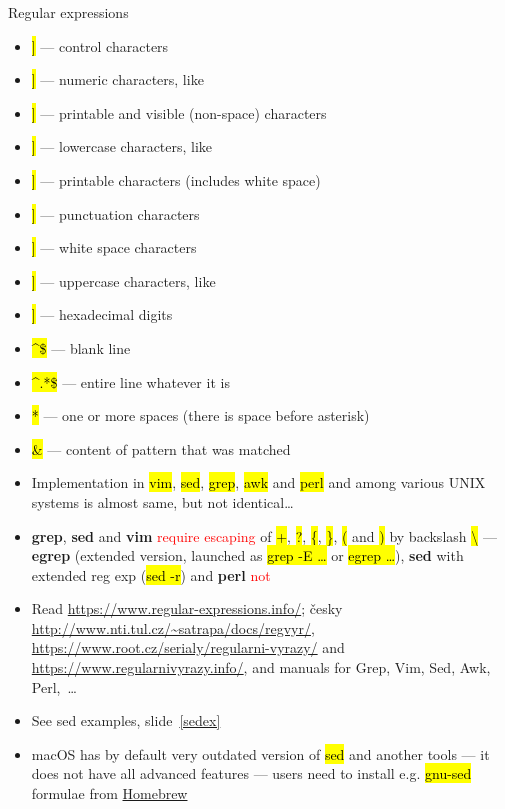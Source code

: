 \documentclass[compress, ucs, xelatex, 11pt, xcolor=svgnames,
  hyperref={
    bookmarks=true,
    unicode=true,
    colorlinks=true,
    pdftitle={Linux, command line and MetaCentrum},
    plainpages=false,
    pdfauthor={Vojtech Zeisek},
    pdfsubject={Course about use of Linux command line, writing shell scripts and using MetaCentrum of CESNET},
    pdfcreator={XeLaTeX},
    pdfkeywords={Linux, GNU, BASH, shell, command line, MetaCentrum},
    linkcolor=DarkRed,
    anchorcolor=DarkBlue,
    citecolor=Indigo,
    filecolor=NavyBlue,
    menucolor=DarkMagenta,
    urlcolor=DarkBlue,
    pdftex},
  url={hyphens, lowtilde} %
  ]{beamer}
\renewcommand{\texttt}[1]{\hl{\ttfamily #1}}
\renewcommand{\alert}[1]{\textcolor{red}{#1}}
\begin{document}
\begin{frame}[allowframebreaks]{Regular expressions}
\begin{itemize}
    \item \alert{\texttt{[[:cntrl:]]}} --- control characters
    \item \alert{\texttt{[[:digit:]]}} --- numeric characters, like \alert{\texttt{[0-9]}}
    \item \alert{\texttt{[[:graph:]]}} --- printable and visible (non-space) characters
    \item \alert{\texttt{[[:lower:]]}} --- lowercase characters, like \alert{\texttt{[a-z]}}
    \item \alert{\texttt{[[:print:]]}} --- printable characters (includes white space)
    \item \alert{\texttt{[[:punct:]]}} --- punctuation characters
    \item \alert{\texttt{[[:space:]]}} --- white space characters
    \item \alert{\texttt{[[:upper:]]}} --- uppercase characters, like \alert{\texttt{[A-Z]}}
    \item \alert{\texttt{[[:xdigit:]]}} --- hexadecimal digits
    \item \alert{\texttt{\textasciicircum\$}} --- blank line
    \item \alert{\texttt{\textasciicircum.*\$}} --- entire line whatever it is
    \item \alert{\texttt{ *}} --- one or more spaces (there is space before asterisk)
    \item \alert{\texttt{\&}} --- content of pattern that was matched
    \item Implementation in \texttt{vim}, \texttt{sed}, \texttt{grep}, \texttt{awk} and \texttt{perl} and among various UNIX systems is almost same, but not identical\ldots
    \item \textbf{grep}, \textbf{sed} and \textbf{vim} \alert{require escaping} of \alert{\texttt{+}}, \alert{\texttt{?}}, \alert{\texttt{\{}}, \alert{\texttt{\}}}, \alert{\texttt{(}} and \alert{\texttt{)}} by backslash \alert{\texttt{\textbackslash}} --- \textbf{egrep} (extended version, launched as \texttt{grep -E \ldots} or \texttt{egrep \ldots}), \textbf{sed} with extended reg exp (\texttt{sed -r}) and \textbf{perl} \alert{not}
    \item Read \url{https://www.regular-expressions.info/}; česky \url{http://www.nti.tul.cz/~satrapa/docs/regvyr/}, \url{https://www.root.cz/serialy/regularni-vyrazy/} and \url{https://www.regularnivyrazy.info/}, and manuals for Grep, Vim, Sed, Awk, Perl,~\ldots
    \item See sed examples, slide~\ref{sedex}
    \item macOS has by default very outdated version of \texttt{sed} and another tools --- it does not have all advanced features --- users need to install e.g. \texttt{gnu-sed} formulae from \href{https://brew.sh/}{Homebrew}
  \end{itemize}
\end{frame}
\end{document}
